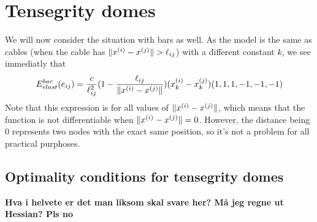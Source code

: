 \section{Tensegrity domes}
We will now consider the situation with bars as well. As the model is the same as cables (when the cable has $\lVert x^{(i)} - x^{(j)}\rVert > \ell_{ij}$) with a different constant $k$, we see immediatly that
\begin{equation*}
E^{bar}_{elast}(e_{ij}) = \frac{c}{\ell_{ij}^2} (1- \frac{\ell_{ij}}{\lVert x^{(i)} - x^{(j)}\rVert}) (x_k^{(i)} - x_k^{(j)}) ( 1, 1, 1,-1,-1,-1)
\end{equation*}
Note that this expression is for all values of $\lVert x^{(i)} - x^{(j)}\rVert$, which means that the function is not differentiable when $\lVert x^{(i)} - x^{(j)}\rVert = 0$. However, the distance being $0$ represents two nodes with the exact same position, so it's not a problem for all practical purphoses.

\subsection{Optimality conditions for tensegrity domes}


\textbf{Hva i helvete er det man liksom skal svare her? Må jeg regne ut Hessian? Pls no}
